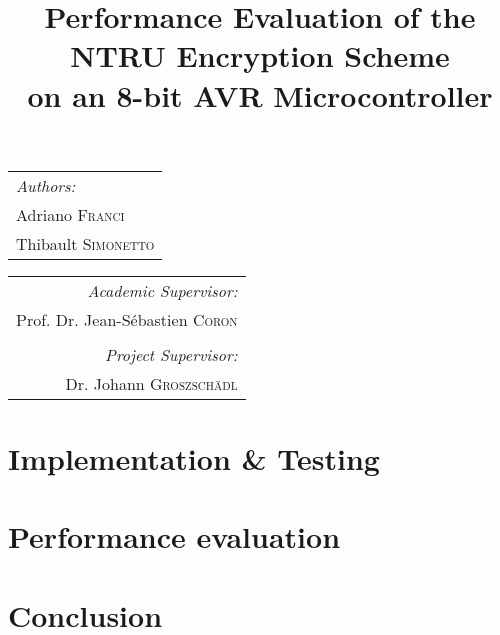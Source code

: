 \documentclass[11pt,a4paper]{article}
\begin{document}
\title{Performance Evaluation of the NTRU Encryption Scheme\\ on an 8-bit AVR 
Microcontroller}
\maketitle

\begin{tabular}[t]{@{}l} 
	\textit{Authors:}\\
	Adriano \textsc{Franci}\\
	Thibault \textsc{Simonetto}\\
\end{tabular}
\hfill
\begin{tabular}[t]{r@{}}
	\textit{Academic Supervisor:}\\
	Prof. Dr. Jean-S\'ebastien \textsc{Coron}\\
	\vspace{1em}\\
	\textit{Project Supervisor:}\\
	Dr. Johann \textsc{Groszsch\"adl}\\
\end{tabular}






\section{Implementation \& Testing}
\section{Performance evaluation}
\section{Conclusion}




\end{document}
